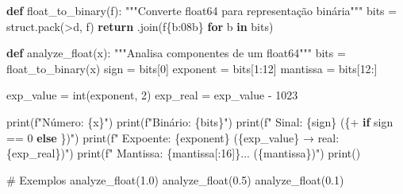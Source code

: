 \documentclass[
  11pt,
  letterpaper,
  DIV=11,
  numbers=noendperiod]{scrartcl}
\newenvironment{Shaded}{\begin{snugshade}}{\end{snugshade}}
\newcommand{\BuiltInTok}[1]{\textcolor[rgb]{0.00,0.23,0.31}{#1}}
\newcommand{\CommentTok}[1]{\textcolor[rgb]{0.37,0.37,0.37}{#1}}
\newcommand{\ControlFlowTok}[1]{\textcolor[rgb]{0.00,0.23,0.31}{\textbf{#1}}}
\newcommand{\DecValTok}[1]{\textcolor[rgb]{0.68,0.00,0.00}{#1}}
\newcommand{\FloatTok}[1]{\textcolor[rgb]{0.68,0.00,0.00}{#1}}
\newcommand{\KeywordTok}[1]{\textcolor[rgb]{0.00,0.23,0.31}{\textbf{#1}}}
\newcommand{\NormalTok}[1]{\textcolor[rgb]{0.00,0.23,0.31}{#1}}
\newcommand{\OperatorTok}[1]{\textcolor[rgb]{0.37,0.37,0.37}{#1}}
\newcommand{\SpecialCharTok}[1]{\textcolor[rgb]{0.37,0.37,0.37}{#1}}
\newcommand{\SpecialStringTok}[1]{\textcolor[rgb]{0.13,0.47,0.30}{#1}}
\newcommand{\StringTok}[1]{\textcolor[rgb]{0.13,0.47,0.30}{#1}}
\begin{document}
\begin{Shaded}
\begin{Highlighting}[]
\KeywordTok{def}\NormalTok{ float\_to\_binary(f):}
    \CommentTok{"""Converte float64 para representação binária"""}
\NormalTok{    bits }\OperatorTok{=}\NormalTok{ struct.pack(}\StringTok{\textquotesingle{}\textgreater{}d\textquotesingle{}}\NormalTok{, f)}
    \ControlFlowTok{return} \StringTok{\textquotesingle{}\textquotesingle{}}\NormalTok{.join(}\SpecialStringTok{f\textquotesingle{}}\SpecialCharTok{\{}\NormalTok{b}\SpecialCharTok{:08b\}}\SpecialStringTok{\textquotesingle{}} \ControlFlowTok{for}\NormalTok{ b }\KeywordTok{in}\NormalTok{ bits)}

\KeywordTok{def}\NormalTok{ analyze\_float(x):}
    \CommentTok{"""Analisa componentes de um float64"""}
\NormalTok{    bits }\OperatorTok{=}\NormalTok{ float\_to\_binary(x)}
\NormalTok{    sign }\OperatorTok{=}\NormalTok{ bits[}\DecValTok{0}\NormalTok{]}
\NormalTok{    exponent }\OperatorTok{=}\NormalTok{ bits[}\DecValTok{1}\NormalTok{:}\DecValTok{12}\NormalTok{]}
\NormalTok{    mantissa }\OperatorTok{=}\NormalTok{ bits[}\DecValTok{12}\NormalTok{:]}
    
\NormalTok{    exp\_value }\OperatorTok{=} \BuiltInTok{int}\NormalTok{(exponent, }\DecValTok{2}\NormalTok{)}
\NormalTok{    exp\_real }\OperatorTok{=}\NormalTok{ exp\_value }\OperatorTok{{-}} \DecValTok{1023}
    
    \BuiltInTok{print}\NormalTok{(}\SpecialStringTok{f"Número: }\SpecialCharTok{\{}\NormalTok{x}\SpecialCharTok{\}}\SpecialStringTok{"}\NormalTok{)}
    \BuiltInTok{print}\NormalTok{(}\SpecialStringTok{f"Binário: }\SpecialCharTok{\{}\NormalTok{bits}\SpecialCharTok{\}}\SpecialStringTok{"}\NormalTok{)}
    \BuiltInTok{print}\NormalTok{(}\SpecialStringTok{f"  Sinal:    }\SpecialCharTok{\{}\NormalTok{sign}\SpecialCharTok{\}}\SpecialStringTok{ (}\SpecialCharTok{\{}\StringTok{\textquotesingle{}+\textquotesingle{}} \ControlFlowTok{if}\NormalTok{ sign }\OperatorTok{==} \StringTok{\textquotesingle{}0\textquotesingle{}} \ControlFlowTok{else} \StringTok{\textquotesingle{}{-}\textquotesingle{}}\SpecialCharTok{\}}\SpecialStringTok{)"}\NormalTok{)}
    \BuiltInTok{print}\NormalTok{(}\SpecialStringTok{f"  Expoente: }\SpecialCharTok{\{}\NormalTok{exponent}\SpecialCharTok{\}}\SpecialStringTok{ (}\SpecialCharTok{\{}\NormalTok{exp\_value}\SpecialCharTok{\}}\SpecialStringTok{ → real: }\SpecialCharTok{\{}\NormalTok{exp\_real}\SpecialCharTok{\}}\SpecialStringTok{)"}\NormalTok{)}
    \BuiltInTok{print}\NormalTok{(}\SpecialStringTok{f"  Mantissa: }\SpecialCharTok{\{}\NormalTok{mantissa[:}\DecValTok{16}\NormalTok{]}\SpecialCharTok{\}}\SpecialStringTok{... (}\SpecialCharTok{\{}\NormalTok{mantissa}\SpecialCharTok{\}}\SpecialStringTok{)"}\NormalTok{)}
    \BuiltInTok{print}\NormalTok{()}

\CommentTok{\# Exemplos}
\NormalTok{analyze\_float(}\FloatTok{1.0}\NormalTok{)}
\NormalTok{analyze\_float(}\FloatTok{0.5}\NormalTok{)}
\NormalTok{analyze\_float(}\FloatTok{0.1}\NormalTok{)}
\end{Highlighting}
\end{Shaded}
\end{document}
